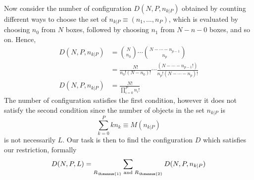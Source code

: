 \documentclass[../../main.tex]{subfiles}
\begin{document}
Now consider the number of configuration $D(N,P,n_{k|P})$ obtained by counting different ways to choose the set of $n_{k|P}\equiv(n_1,\dots,n_P)$, which is evaluated by choosing $n_0$ from $N$ boxes, followed by choosing $n_1$ from $N-n-0$ boxes, and so on. Hence,
\begin{align*}
    D(N,P,n_{k|P})&={N\choose n_0}\cdots{N-\cdots-n_{p-1} \choose n_p}\\
    &=\frac{N!}{n_0!(N-n_0)!}\cdots \frac{(N-\cdots-n_{p-1}!)}{n_p!(N-\cdots-n_p)!}\\
    D(N,P,n_{k|P})&=\frac{N!}{\displaystyle\prod_{i=0}^{P}n_i!}
\end{align*} 
The number of configuration satisfies the first condition, however it does not satisfy the second condition since the number of objects in the set $n_{k|P}$ is 
\begin{equation*}
    \sum_{k=0}^{P }kn_k\equiv M(n_{k|P})
\end{equation*}
is not necessarily $L$. Our task is then to find the configuration $D$ which satisfies our restriction, formally 
\begin{equation*}
    D(N,P,L)=\sum_{R_\Romannum{1}\text{ and }R_\Romannum{2}}D(N,P,n_{k|P})
\end{equation*}
\end{document}
